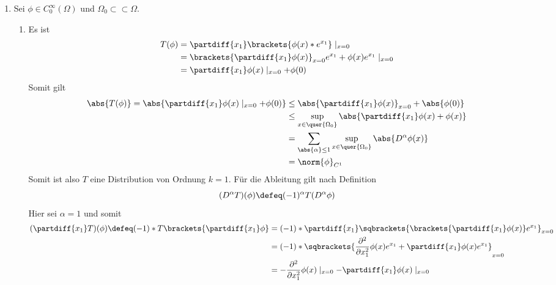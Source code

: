 \begin{exercisePage}
	\begin{enumerate}[label=(zu \alph*), leftmargin=*]
		\item Sei $\phi \in C_0^\infty(\Omega)$ und $\Omega_0 \subset \subset \Omega$.
		\begin{enumerate}[label=(zu \roman*), leftmargin=*]
			\item Es ist 
			\begin{equation*}
				\begin{aligned}
					T(\phi) &= \partdiff{x_1} \brackets{\phi(x) * e^{x_1}} \mid_{x=0} \\
					&= \brackets{\partdiff{x_1} \phi(x)}_{x=0} e^{x_1} + \phi(x) e^{x_1} \mid_{x=0} \\
					&= \partdiff{x_1} \phi(x) \mid_{x=0} + \phi(0)
				\end{aligned}
			\end{equation*}
			Somit gilt
			\begin{equation*}
				\begin{aligned}
				\abs{T(\phi)} = \abs{\partdiff{x_1} \phi(x) \mid_{x=0} + \phi(0)} 
				&\le \abs{\partdiff{x_1} \phi(x)}_{x=0} + \abs{\phi(0)} \\
				&\le \sup_{x \in \quer{\Omega_0}} \abs{\partdiff{x_1} \phi(x) + \phi(x)} \\
					&= \sum_{\abs{\alpha} \le 1} \sup_{x \in \quer{\Omega_0}} \abs{D^\alpha \phi(x)} \\
					&= \norm{\phi}_{C^1}
				\end{aligned}
			\end{equation*}
			Somit ist also $T$ eine Distribution von Ordnung $k = 1$.
			Für die Ableitung gilt nach Definition
			\begin{equation*}
				(D^\alpha T)(\phi) \defeq (-1)^\alpha T(D^\alpha \phi)
			\end{equation*}
			Hier sei $\alpha = 1$ und somit 
			\begin{equation*}
				\begin{aligned}
					(\partdiff{x_1} T)(\phi) \defeq (-1) * T\brackets{\partdiff{x_1} \phi} 
					&= (-1) * \partdiff{x_1} \sqbrackets{\brackets{\partdiff{x_1} \phi(x)} e^{x_1}}_{x=0} \\
					&= (-1) * \sqbrackets{\frac{\partial^2}{\partial x_1^2} \phi(x) e^{x_1} + \partdiff{x_1} \phi(x) e^{x_1}}_{x=0} \\
					&= - \frac{\partial^2}{\partial x_1^2} \phi(x) \mid_{x=0} - \partdiff{x_1} \phi(x) \mid_{x=0}
				\end{aligned}
			\end{equation*}

\end{enumerate}
\end{enumerate}
\end{exercisePage}
